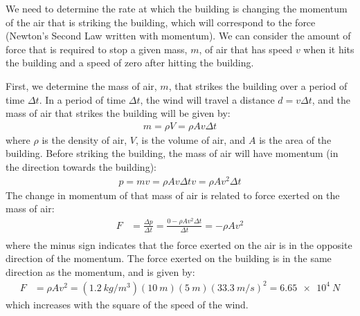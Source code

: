 \begin{solution}
We need to determine the rate at which the building is changing the momentum of the air that is striking the building, which will correspond to the force (Newton's Second Law written with momentum). We can consider the amount of force that is required to stop a given mass, $m$, of air that has speed $v$ when it hits the building and a speed of zero after hitting the building. 

First, we determine the mass of air, $m$, that strikes the building over a period of time $\Delta t$. In a period of time $\Delta t$, the wind will travel a distance $d=v\Delta t$, and the mass of air that strikes the building will be given by:
\begin{align*}
 m = \rho V=\rho A v\Delta t
\end{align*}
where $\rho$ is the density of air, $ V$, is the volume of air, and $A$ is the area of the building. Before striking the building, the mass of air will have momentum (in the direction towards the building):
\begin{align*}
p = m v=\rho A v\Delta t v=\rho A v^2\Delta t
\end{align*}
The change in momentum of that mass of air is related to force exerted on the mass of air:
\begin{align*}
F&=\frac{\Delta p}{\Delta t}=\frac{0-\rho A v^2\Delta t}{\Delta t}=-\rho A v^2\\
\end{align*}
where the minus sign indicates that the force exerted on the air is in the opposite direction of the momentum. The force exerted on the building is in the same direction as the momentum, and is given by:
\begin{align*}
F&=\rho A v^2=(\SI{1.2}{kg/m^3})(\SI{10}{m})(\SI{5}{m})(\SI{33.3}{m/s})^2=\SI{6.65e4}{N}
\end{align*}
which increases with the square of the speed of the wind.
\end{solution}

